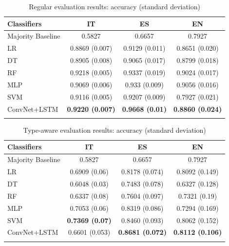 \documentclass[output=paper
,modfonts
,nonflat]{langsci/langscibook}
\begin{document}
\begin{table}[!ht]
\caption{Regular evaluation results: accuracy (standard deviation)}
\label{tab:regular}
 \begin{tabular}{lccc} 
  \lsptoprule
   Classifiers & IT & ES & EN  \\
  \midrule
   Majority Baseline & 0.5827 & 0.6657 & 0.7927\\
   LR & 0.8869 (0.007)  & 0.9129 (0.011) & 0.8651 (0.020)  \\
   DT  & 0.8905 (0.008) & 0.9065 (0.017) &  0.8799 (0.018) \\
   RF & 0.9218 (0.005) & 0.9337 (0.019)  &  0.9024 (0.017)\\
   MLP & 0.9069 (0.006) & 0.933 (0.009) &  0.9056 (0.016) \\
   SVM  & 0.9116 (0.005) & 0.9207 (0.009) & 0.7927 (0.021) \\
   ConvNet+LSTM  & \textbf{0.9220 (0.007)} & \textbf{0.9668 (0.01)} & \textbf{0.8860 (0.024)} \\
  \lspbottomrule
 \end{tabular}
\end{table}


\begin{table}[!ht]
\caption{Type-aware evaluation results: accuracy (standard deviation)}
\label{tab:typeaware}
 \begin{tabular}{lccc} 
  \lsptoprule
  Classifiers & IT & ES & EN  \\
  \midrule
   Majority Baseline & 0.5827 & 0.6657 & 0.7927\\
   LR & 0.6909 (0.06)  & 0.8178 (0.074) & 0.8092 (0.149)  \\
   DT  & 0.6048 (0.03) & 0.7483 (0.078) & 0.6327 (0.128) \\
   RF & 0.6337 (0.08) & 0.7604 (0.097) & 0.7321 (0.19) \\
   MLP  & 0.7053 (0.06) & 0.8319 (0.086) & 0.7294 (0.169) \\
   SVM  & \textbf{0.7369 (0.07)} & 0.8460 (0.093) & 0.8062 (0.152) \\
   ConvNet+LSTM  & 0.6601 (0.053) & \textbf{0.8681 (0.072)} & \textbf{0.8112 (0.106)} \\
  \lspbottomrule
 \end{tabular}
\end{table}
\end{document}
